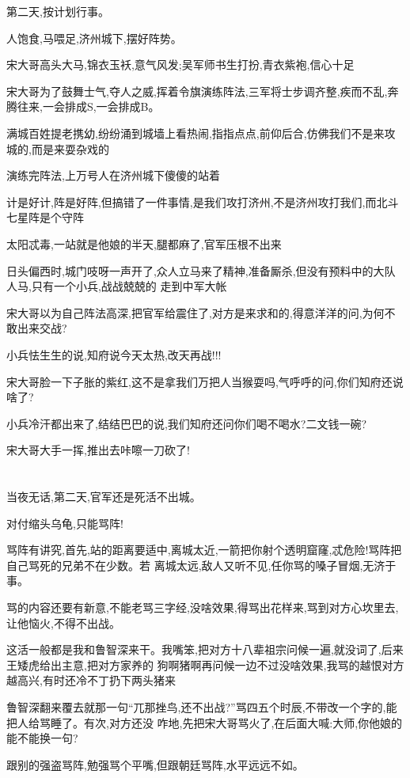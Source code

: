 ﻿\documentclass[12pt]{article}
\begin{document}
第二天,按计划行事。

人饱食,马喂足,济州城下,摆好阵势。

宋大哥高头大马,锦衣玉袄,意气风发;吴军师书生打扮,青衣紫袍,信心十足

宋大哥为了鼓舞士气,夺人之威,挥着令旗演练阵法,三军将士步调齐整,疾而不乱,奔腾往来,一会排成S,一会排成B。

满城百姓提老携幼,纷纷涌到城墙上看热闹,指指点点,前仰后合,仿佛我们不是来攻城的,而是来耍杂戏的\dldots

演练完阵法,上万号人在济州城下傻傻的站着

计是好计,阵是好阵,但搞错了一件事情,是我们攻打济州,不是济州攻打我们,而北斗七星阵是个守阵

太阳忒毒,一站就是他娘的半天,腿都麻了,官军压根不出来

日头偏西时,城门吱呀一声开了,众人立马来了精神,准备厮杀,但没有预料中的大队人马,只有一个小兵,战战兢兢的
走到中军大帐

宋大哥以为自己阵法高深,把官军给震住了,对方是来求和的,得意洋洋的问,为何不敢出来交战?

小兵怯生生的说,知府说今天太热,改天再战!!!

宋大哥脸一下子胀的紫红,这不是拿我们万把人当猴耍吗,气呼呼的问,你们知府还说啥了?

小兵冷汗都出来了,结结巴巴的说,我们知府还问你们喝不喝水?二文钱一碗?

宋大哥大手一挥,推出去咔嚓一刀砍了!
\section{}

当夜无话,第二天,官军还是死活不出城。

对付缩头乌龟,只能骂阵!

骂阵有讲究,首先,站的距离要适中,离城太近,一箭把你射个透明窟窿,忒危险!骂阵把自己骂死的兄弟不在少数。若
离城太远,敌人又听不见,任你骂的嗓子冒烟,无济于事。

骂的内容还要有新意,不能老骂三字经,没啥效果,得骂出花样来,骂到对方心坎里去,让他恼火,不得不出战。

这活一般都是我和鲁智深来干。我嘴笨,把对方十八辈祖宗问候一遍,就没词了,后来王矮虎给出主意,把对方家养的
狗啊猪啊再问候一边\dldots 不过没啥效果,我骂的越恨对方越高兴,有时还冷不丁扔下两头猪来\dldots

鲁智深翻来覆去就那一句``兀那挫鸟,还不出战?''骂四五个时辰,不带改一个字的,能把人给骂睡了。有次,对方还没
咋地,先把宋大哥骂火了,在后面大喊:大师,你他娘的能不能换一句?

跟别的强盗骂阵,勉强骂个平嘴,但跟朝廷骂阵,水平远远不如。
\end{document}

